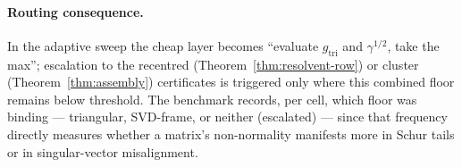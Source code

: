 \documentclass[11pt, a4paper]{article}
\numberwithin{equation}{section}
\begin{document}
\paragraph{Routing consequence.}
In the adaptive sweep the cheap layer becomes ``evaluate $g_{\mathrm{tri}}$ and
$\gamma^{1/2}$, take the max''; escalation to the recentred
(Theorem~\ref{thm:resolvent-row}) or cluster (Theorem~\ref{thm:assembly})
certificates is triggered only where this combined floor remains below
threshold.  The benchmark records, per cell, which floor was binding ---
triangular, SVD-frame, or neither (escalated) --- since that frequency directly
measures whether a matrix's non-normality manifests more in Schur tails or in
singular-vector misalignment.
\end{document}
